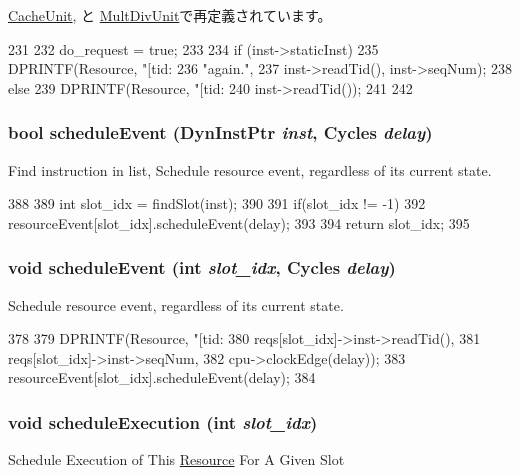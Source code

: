 \hyperlink{classCacheUnit_a9063fd6f97e36e3565247339ffa3882c}{CacheUnit}, と \hyperlink{classMultDivUnit_a9063fd6f97e36e3565247339ffa3882c}{MultDivUnit}で再定義されています。


\begin{DoxyCode}
231 {
232     do_request = true;
233 
234     if (inst->staticInst) {
235         DPRINTF(Resource, "[tid:%
236                 "again.\n",
237                 inst->readTid(), inst->seqNum);
238     } else {
239         DPRINTF(Resource, "[tid:%
240                 inst->readTid());
241     }
242 }
\end{DoxyCode}
\hypertarget{classResource_a9463594c1003adcd1e810ad6cea904eb}{
\subsubsection[{scheduleEvent}]{\setlength{\rightskip}{0pt plus 5cm}bool scheduleEvent ({\bf DynInstPtr} {\em inst}, \/  {\bf Cycles} {\em delay})}}
\label{classResource_a9463594c1003adcd1e810ad6cea904eb}
Find instruction in list, Schedule resource event, regardless of its current state. 


\begin{DoxyCode}
388 {
389     int slot_idx = findSlot(inst);
390 
391     if(slot_idx != -1)
392         resourceEvent[slot_idx].scheduleEvent(delay);
393 
394     return slot_idx;
395 }
\end{DoxyCode}
\hypertarget{classResource_a55e9744a3539be9ff746b13b1d6bafc3}{
\subsubsection[{scheduleEvent}]{\setlength{\rightskip}{0pt plus 5cm}void scheduleEvent (int {\em slot\_\-idx}, \/  {\bf Cycles} {\em delay})}}
\label{classResource_a55e9744a3539be9ff746b13b1d6bafc3}
Schedule resource event, regardless of its current state. 


\begin{DoxyCode}
378 {
379     DPRINTF(Resource, "[tid:%
380             reqs[slot_idx]->inst->readTid(),
381             reqs[slot_idx]->inst->seqNum,
382             cpu->clockEdge(delay));
383     resourceEvent[slot_idx].scheduleEvent(delay);
384 }
\end{DoxyCode}
\hypertarget{classResource_a9f90c5efcf202dda43bb780a645bee1f}{
\subsubsection[{scheduleExecution}]{\setlength{\rightskip}{0pt plus 5cm}void scheduleExecution (int {\em slot\_\-idx})}}
\label{classResource_a9f90c5efcf202dda43bb780a645bee1f}
Schedule Execution of This \hyperlink{classResource}{Resource} For A Given Slot 


